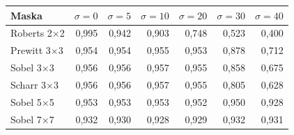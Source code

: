 \begin{tabular}{lrrrrrr}
\toprule
Maska & $\sigma = 0$ & $\sigma = 5$ & $\sigma = 10$ & $\sigma = 20$ & $\sigma = 30$ & $\sigma = 40$ \\
\midrule
Roberts 2$\times$2 & 0,995 & 0,942 & 0,903 & 0,748 & 0,523 & 0,400 \\
Prewitt 3$\times$3 & 0,954 & 0,954 & 0,955 & 0,953 & 0,878 & 0,712 \\
Sobel 3$\times$3 & 0,956 & 0,956 & 0,957 & 0,955 & 0,858 & 0,675 \\
Scharr 3$\times$3 & 0,956 & 0,956 & 0,957 & 0,955 & 0,805 & 0,628 \\
Sobel 5$\times$5 & 0,953 & 0,953 & 0,953 & 0,952 & 0,950 & 0,928 \\
Sobel 7$\times$7 & 0,932 & 0,930 & 0,928 & 0,929 & 0,932 & 0,931 \\
\bottomrule
\end{tabular}
